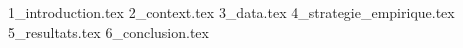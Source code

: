 \documentclass[7pt]{article}
\begin{document}

\newpage 
\fancyhf{}
\renewcommand{\headrulewidth}{0pt}
\fancyfoot[R]{{{{\thepage}\hspace{-1cm}}}}
\pagestyle{fancy}
\thispagestyle{fancy}
\setcounter{page}{1}
{1_introduction.tex}   
{2_context.tex}   
{3_data.tex}   
{4_strategie_empirique.tex}   
{5_resultats.tex}   
\newpage
{6_conclusion.tex}   
 
\nocite{*}
\newpage
\printbibliography[title={Références}]
\end{document}
